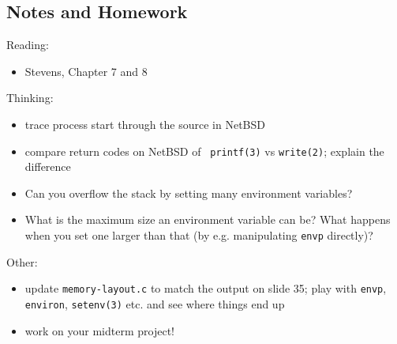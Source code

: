 \documentclass[xga]{xdvislides}
\begin{document}
\subsection{Notes and Homework}

Reading:
\begin{itemize}
	\item Stevens, Chapter 7 and 8
\end{itemize}
\vspace{.5in}
Thinking:
\begin{itemize}
	\item trace process start through the source in NetBSD
	\item compare return codes on NetBSD of {\tt
		printf(3)} vs {\tt write(2)}; explain
		the difference
	\item Can you overflow the stack by setting many environment variables?
	\item What is the maximum size an environment variable can be? What happens when you set one larger than that (by e.g. manipulating {\tt envp} directly)?
\end{itemize}
\vspace{.5in}
Other:
\begin{itemize}
	\item update {\tt memory-layout.c} to match the output on slide 35; play with {\tt envp}, {\tt environ}, {\tt setenv(3)} etc. and see where things end up
	\item work on your midterm project!
\end{itemize}
\end{document}
